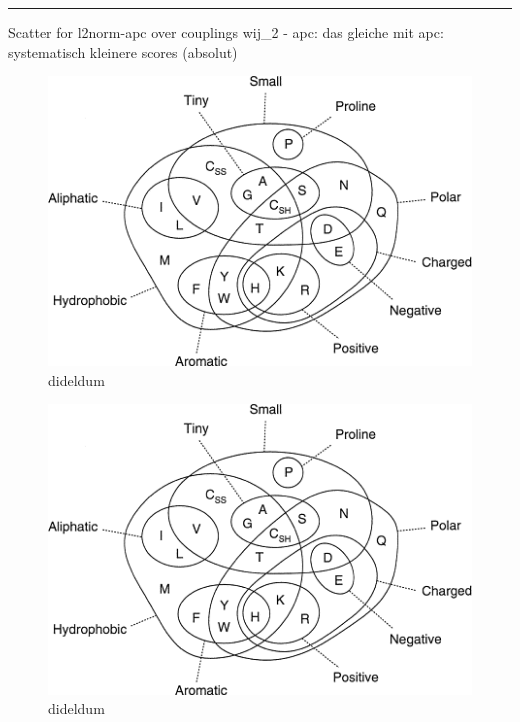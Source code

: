 \documentclass[11pt,a4paper,twoside]{book}
\theoremstyle{definition}
\theoremstyle{definition}
\theoremstyle{remark}
\begin{document}
\begin{center}\rule{0.5\linewidth}{\linethickness}\end{center}

Scatter for l2norm-apc over couplings
\textbar{}\textbar{}wij\textbar{}\textbar{}\_2 - apc: das gleiche mit
apc: systematisch kleinere scores (absolut)

\begin{figure}

{\centering \includegraphics[width=1\linewidth]{img/aa_venn_diagram} 

}

\caption{dideldum}\label{fig:comparing-cd-pll-scatter3}
\end{figure}

\begin{figure}

{\centering \includegraphics[width=1\linewidth]{img/aa_venn_diagram} 

}

\caption{dideldum}\label{fig:comapring-cd-pll-boxplot3}
\end{figure}
\end{document}
